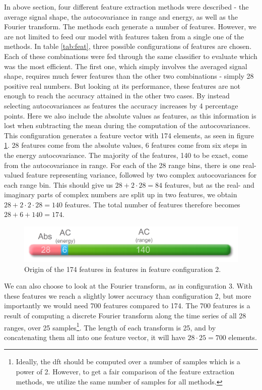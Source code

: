 In above section, four different feature extraction methods were described - the average signal shape, the autocovariance in range and energy, as well as the Fourier transform. The methods each generate a number of features. However, we are not limited to feed our model with features taken from a single one of the methods. In table \ref{tab:feat}, three possible configurations of features are chosen. Each of these combinations were fed through the same classifier to evaluate which was the most efficient. The first one, which simply involves the averaged signal shape, requires much fewer features than the other two combinations - simply 28 positive real numbers. But looking at its performance, these features are not enough to reach the accuracy attained in the other two cases. By instead selecting autocovariances as features the accuracy increases by 4 percentage points. Here we also include the absolute values as features, as this information is lost when subtracting the mean during the computation of the autocovariances. This configuration generates a feature vector with 174 elements, as seen in figure \ref{fig:feat_fig}. 28 features come from the absolute values, 6 features come from six steps in the energy autocovariance. The majority of the features, 140 to be exact, come from the autocovariance in range. For each of the 28 range bins, there is one real-valued feature representing variance, followed by two complex autocovariances for each range bin. This should give us $28+2\cdot 28=84$ features, but as the real- and imaginary parts of complex numbers are split up in two features, we obtain $28+2\cdot2\cdot 28=140$ features. The total number of features therefore becomes $28+6+140=174$.

\begin{figure}[h]
	\centering
	\includegraphics[scale=0.8]{figs_temp/features.jpg}
	\caption{Origin of the 174 features in features in feature configuration 2.}
	\label{fig:feat_fig}
\end{figure}

We can also choose to look at the Fourier transform, as in configuration 3. With these features we reach a slightly lower accuracy than configuration 2, but more importantly we would need 700 features compared to 174. The 700 features is a result of computing a discrete Fourier transform along the time series of all 28 ranges, over 25 samples\footnote{Ideally, the \gls{dft} should be computed over a number of samples which is a power of 2. However, to get a fair comparison of the feature extraction methods, we utilize the same number of samples for all methods.}. The length of each transform is 25, and by concatenating them all into one feature vector, it will have $28\cdot 25=700$ elements.

